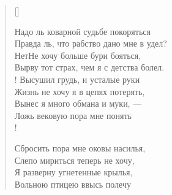 \newpage
\vspace*{0cm}


\settowidth{\versewidth}{\vinПравда ль, что рабство дано мне в удел?}
\begin{verse}[\versewidth]
\begin{altverse}
Надо ль коварной судьбе покоряться\ldotsq\\
    Правда ль, что рабство дано мне в удел?\\
Нет\ldotse Не хочу больше бури бояться,\\
	Вырву тот страх, чем я с детства болел.\\!
Высушил грудь, и усталые руки\ldotst\\
    Жизнь не хочу я в цепях потерять,\\
Вынес я много обмана и муки, ---\\
    Ложь вековую пора мне понять\ldotst\\!

Сбросить пора мне оковы насилья,\\
    Слепо мириться теперь не хочу,\\
Я разверну угнетенные крылья,\\
    Вольною птицею ввысь полечу\ldotst
\end{altverse}
\end{verse}


\newpage
\vspace*{0cm}

